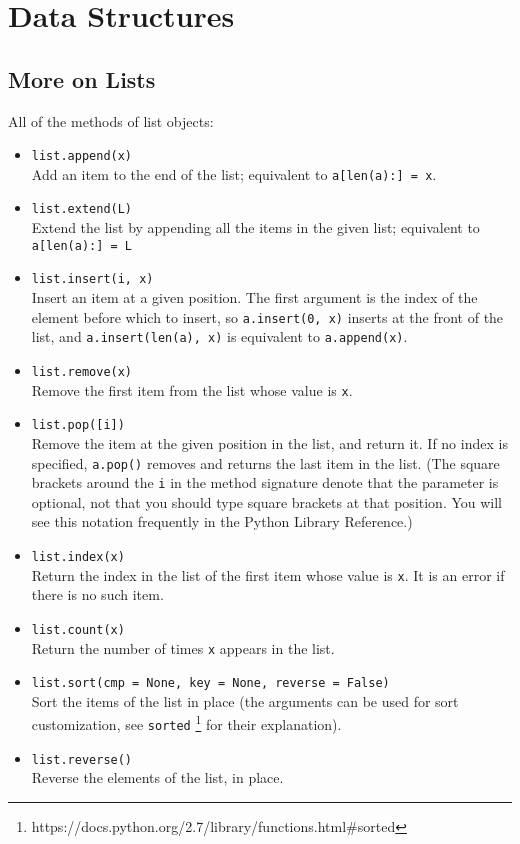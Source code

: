 \documentclass[UTF8]{article}
\begin{document}
\section{Data Structures}
\subsection{More on Lists}
All of the methods of list objects:
\begin{itemize}
    \item \texttt{list.append(x)} \\
    Add an item to the end of the list; equivalent to \texttt{a[len(a):] = x}.
    \item \texttt{list.extend(L)} \\
    Extend the list by appending all the items in the given list; equivalent to
    \texttt{a[len(a):] = L}
    \item \texttt{list.insert(i, x)} \\
    Insert an item at a given position. The first argument is the index of the element before which
    to insert, so \texttt{a.insert(0, x)} inserts at the front of the list, and
    \texttt{a.insert(len(a), x)} is equivalent to \texttt{a.append(x)}.
    \item \texttt{list.remove(x)} \\
    Remove the first item from the list whose value is \texttt{x}.
    \item \texttt{list.pop([i])} \\
    Remove the item at the given position in the list, and return it. If no index is specified,
    \texttt{a.pop()} removes and returns the last item in the list. (The square brackets around the
    \texttt{i} in the method signature denote that the parameter is optional, not that you should
    type square brackets at that position. You will see this notation frequently in the Python
    Library Reference.)
    \item \texttt{list.index(x)} \\
    Return the index in the list of the first item whose value is \texttt{x}. It is an error if
    there is no such item.
    \item \texttt{list.count(x)} \\
    Return the number of times \texttt{x} appears in the list.
    \item \texttt{list.sort(cmp = None, key = None, reverse = False)} \\
    Sort the items of the list in place (the arguments can be used for sort customization, see
    \texttt{sorted} \footnote{https://docs.python.org/2.7/library/functions.html\#sorted} for their
    explanation).
    \item \texttt{list.reverse()} \\
    Reverse the elements of the list, in place.
\end{itemize}
\end{document}
